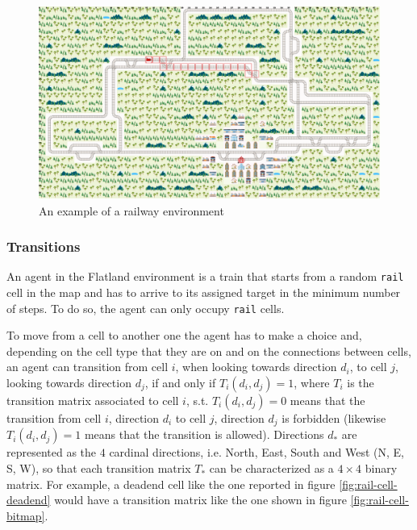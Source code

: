 \documentclass[a4paper,10pt]{report}
\begin{document}
\begin{figure}[h]
	\includegraphics[width=\textwidth]{env.png}
	\caption{An example of a railway environment}
	\label{fig:env-example}
\end{figure}

\subsubsection*{Transitions}
An agent in the Flatland environment is a train that starts from a random \texttt{rail} cell in the map and has to arrive to its assigned target in the minimum number of steps. To do so, the agent can only occupy \texttt{rail} cells.

To move from a cell to another one the agent has to make a choice and, depending on the cell type that they are on and on the connections between cells, an agent can transition from cell $i$, when looking towards direction $d_i$, to cell $j$, looking towards direction $d_j$, if and only if $T_i(d_i, d_j)=1$, where $T_i$ is the transition matrix associated to cell $i$, s.t. $T_i(d_i, d_j)=0$ means that the transition from cell $i$, direction $d_i$ to cell $j$, direction $d_j$ is forbidden (likewise $T_i(d_i, d_j)=1$ means that the transition is allowed). Directions $d_*$ are represented as the $4$ cardinal directions, i.e. North, East, South and West (N, E, S, W), so that each transition matrix $T_*$ can be characterized as a $4\times4$ binary matrix. For example, a deadend cell like the one reported in figure \ref{fig:rail-cell-deadend} would have a transition matrix like the one shown in figure \ref{fig:rail-cell-bitmap}.
\end{document}
